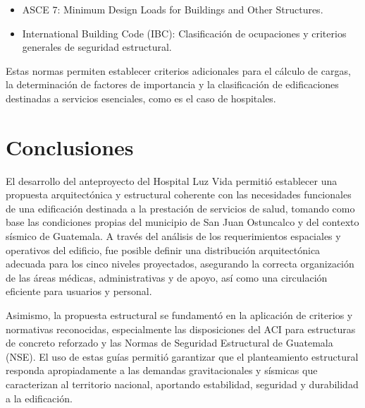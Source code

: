 \documentclass[14pt,letterpaper]{extarticle}
\begin{document}
	\begin{itemize}
		\item ASCE 7: Minimum Design Loads for Buildings and Other Structures.
		\item International Building Code (IBC): Clasificación de ocupaciones y criterios generales de seguridad estructural.
	\end{itemize}
	
	Estas normas permiten establecer criterios adicionales para el cálculo de cargas, la determinación de factores de importancia y la clasificación de edificaciones destinadas a servicios esenciales, como es el caso de hospitales.
	
	
	
	
	
	
	
	
	
	
	
	
	
	
	
	
	
	
	
	
		\newpage
	
	\section*{Conclusiones}
	El desarrollo del anteproyecto del Hospital Luz Vida permitió establecer una propuesta arquitectónica y estructural coherente con las necesidades funcionales de una edificación destinada a la prestación de servicios de salud, tomando como base las condiciones propias del municipio de San Juan Ostuncalco y del contexto sísmico de Guatemala. A través del análisis de los requerimientos espaciales y operativos del edificio, fue posible definir una distribución arquitectónica adecuada para los cinco niveles proyectados, asegurando la correcta organización de las áreas médicas, administrativas y de apoyo, así como una circulación eficiente para usuarios y personal.
	
	Asimismo, la propuesta estructural se fundamentó en la aplicación de criterios y normativas reconocidas, especialmente las disposiciones del ACI para estructuras de concreto reforzado y las Normas de Seguridad Estructural de Guatemala (NSE). El uso de estas guías permitió garantizar que el planteamiento estructural responda apropiadamente a las demandas gravitacionales y sísmicas que caracterizan al territorio nacional, aportando estabilidad, seguridad y durabilidad a la edificación.
	
\end{document}
